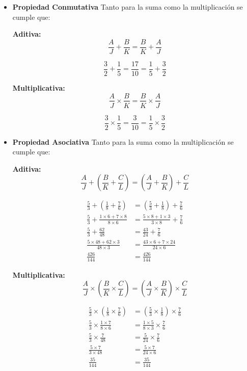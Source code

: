 \begin{itemize}
    \item \textbf{Propiedad Conmutativa} Tanto para la suma como la
        multiplicación se cumple que:

        \textbf{Aditiva:}
        $$\frac{A}{J} +\frac{B}{K} = \frac{B}{K} +\frac{A}{J}$$

        $$ \frac{3}{2} +\frac{1}{5} = \frac{17}{10} = \frac{1}{5} +\frac{3}{2}$$

        \textbf{Multiplicativa:}
        $$ \frac{A}{J} \times\frac{B}{K} = \frac{B}{K} \times\frac{A}{J}$$

        $$ \frac{3}{2} \times\frac{1}{5} = \frac{3}{10} = \frac{1}{5} \times\frac{3}{2}$$

    \item \textbf{Propiedad Asociativa} Tanto para la suma como la
        multiplicación se cumple que:

        \textbf{Aditiva:}
        $$ \frac{A}{J}+\left(\frac{B}{K}+\frac{C}{L}\right)=\left(\frac{A}{J}+\frac{B}{K}\right)+\frac{C}{L}$$

        \begin{align*}
            \frac{5}{3} +\left(\frac{1}{8} +\frac{7}{6}\right) &=\left( \frac{5}{3} +\frac{1}{8}\right) +\frac{7}{6}\\
            \frac{5}{3} +\frac{1\times6+7\times8}{8\times6} &= \frac{5\times8+1\times3}{3\times8}+\frac{7}{6}\\
            \frac{5}{3} + \frac{62}{48} &= \frac{43}{24} +\frac{7}{6} \\
            \frac{5\times48+62\times3}{48\times3} &= \frac{43\times6+7\times24}{24\times6} \\
            \frac{426}{144} &= \frac{426}{144}
        \end{align*}

        \textbf{Multiplicativa:}
        $$\frac{A}{J}\times\left(\frac{B}{K}\times\frac{C}{L}\right)=\left(\frac{A}{J}\times\frac{B}{K}\right)\times\frac{C}{L} $$

        \begin{align*}
            \frac{5}{3}\times \left(\frac{1}{8}\times \frac{7}{6}\right)  &=\left( \frac{5}{3}\times \frac{1}{8}\right)\times \frac{7}{6}\\
            \frac{5}{3} \times \frac{1\times7}{8\times6} &= \frac{1\times5}{8\times3} \times \frac{7}{6} \\
            \frac{5}{3} \times \frac{7}{48} &= \frac{5}{24} \times  \frac{7}{6} \\
            \frac{5\times7}{3\times48} &= \frac{5\times 7}{24\times6} \\
            \frac{35}{144} &= \frac{35}{144}
        \end{align*}


\end{itemize}

